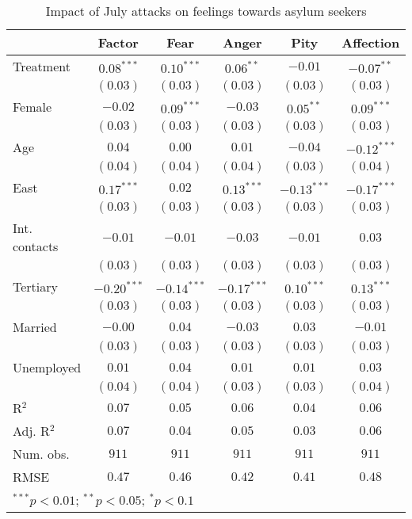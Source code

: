 
\begin{table}
\caption{Impact of July attacks on feelings towards asylum seekers}
\begin{center}
\begin{tabular}{l c c c c c}
\toprule
 & Factor & Fear & Anger & Pity & Affection \\
\midrule
Treatment     & $0.08^{***}$  & $0.10^{***}$  & $0.06^{**}$   & $-0.01$       & $-0.07^{**}$  \\
              & $(0.03)$      & $(0.03)$      & $(0.03)$      & $(0.03)$      & $(0.03)$      \\
Female        & $-0.02$       & $0.09^{***}$  & $-0.03$       & $0.05^{**}$   & $0.09^{***}$  \\
              & $(0.03)$      & $(0.03)$      & $(0.03)$      & $(0.03)$      & $(0.03)$      \\
Age           & $0.04$        & $0.00$        & $0.01$        & $-0.04$       & $-0.12^{***}$ \\
              & $(0.04)$      & $(0.04)$      & $(0.04)$      & $(0.03)$      & $(0.04)$      \\
East          & $0.17^{***}$  & $0.02$        & $0.13^{***}$  & $-0.13^{***}$ & $-0.17^{***}$ \\
              & $(0.03)$      & $(0.03)$      & $(0.03)$      & $(0.03)$      & $(0.03)$      \\
Int. contacts & $-0.01$       & $-0.01$       & $-0.03$       & $-0.01$       & $0.03$        \\
              & $(0.03)$      & $(0.03)$      & $(0.03)$      & $(0.03)$      & $(0.03)$      \\
Tertiary      & $-0.20^{***}$ & $-0.14^{***}$ & $-0.17^{***}$ & $0.10^{***}$  & $0.13^{***}$  \\
              & $(0.03)$      & $(0.03)$      & $(0.03)$      & $(0.03)$      & $(0.03)$      \\
Married       & $-0.00$       & $0.04$        & $-0.03$       & $0.03$        & $-0.01$       \\
              & $(0.03)$      & $(0.03)$      & $(0.03)$      & $(0.03)$      & $(0.03)$      \\
Unemployed    & $0.01$        & $0.04$        & $0.01$        & $0.01$        & $0.03$        \\
              & $(0.04)$      & $(0.04)$      & $(0.03)$      & $(0.03)$      & $(0.04)$      \\
\midrule
R$^2$         & $0.07$        & $0.05$        & $0.06$        & $0.04$        & $0.06$        \\
Adj. R$^2$    & $0.07$        & $0.04$        & $0.05$        & $0.03$        & $0.06$        \\
Num. obs.     & $911$         & $911$         & $911$         & $911$         & $911$         \\
RMSE          & $0.47$        & $0.46$        & $0.42$        & $0.41$        & $0.48$        \\
\bottomrule
\multicolumn{6}{l}{\scriptsize{$^{***}p<0.01$; $^{**}p<0.05$; $^{*}p<0.1$}}
\end{tabular}
\label{tab_emo_no_nice}
\end{center}
\end{table}
